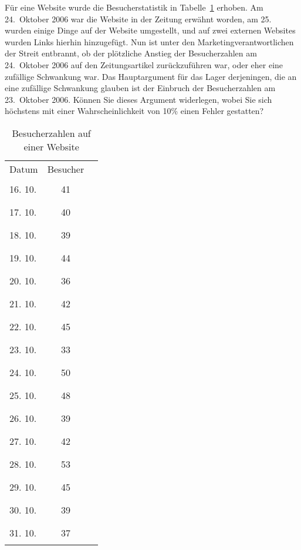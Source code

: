 Für eine Website wurde die Besucherstatistik
in Tabelle~\ref{80000011:besucher}
erhoben. Am 24.~Oktober 2006 war die Website in der Zeitung erwähnt worden,
am 25. wurden einige Dinge auf der Website umgestellt, und auf zwei externen
Websites wurden Links hierhin hinzugefügt.
Nun ist unter den Marketingverantwortlichen der Streit entbrannt,
ob der plötzliche Anstieg der Besucherzahlen am 24.~Oktober 2006
auf den Zeitungsartikel zurückzuführen war, oder eher eine zufällige
Schwankung war.
Das Hauptargument für das Lager derjeningen, die an eine zufällige Schwankung
glauben ist der Einbruch der Besucherzahlen am 23.~Oktober 2006.
Können Sie dieses Argument widerlegen, wobei Sie sich
höchstens mit einer Wahrscheinlichkeit von 10\% einen Fehler gestatten?

\begin{table}
\begin{center}
\begin{tabular}{lcl}
Datum&Besucher&\\
16. 10.&41&\rule{41mm}{5pt}\\
17. 10.&40&\rule{40mm}{5pt}\\
18. 10.&39&\rule{39mm}{5pt}\\
19. 10.&44&\rule{44mm}{5pt}\\
20. 10.&36&\rule{36mm}{5pt}\\
21. 10.&42&\rule{42mm}{5pt}\\
22. 10.&45&\rule{45mm}{5pt}\\
23. 10.&33&\rule{33mm}{5pt}\\
24. 10.&50&\rule{50mm}{5pt}\\
25. 10.&48&\rule{48mm}{5pt}\\
26. 10.&39&\rule{39mm}{5pt}\\
27. 10.&42&\rule{42mm}{5pt}\\
28. 10.&53&\rule{53mm}{5pt}\\
29. 10.&45&\rule{45mm}{5pt}\\
30. 10.&39&\rule{39mm}{5pt}\\
31. 10.&37&\rule{37mm}{5pt}\\
\end{tabular}
\end{center}
\caption{Besucherzahlen auf einer Website\label{80000011:besucher}}
\end{table}

